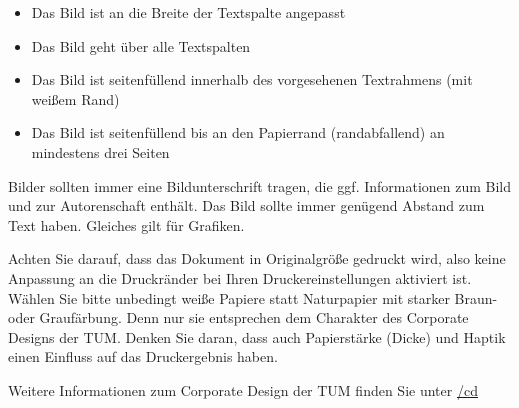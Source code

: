 \begin{itemize}
\item Das Bild ist an die Breite der Textspalte angepasst
\item Das Bild geht über alle Textspalten
\item Das Bild ist seitenfüllend innerhalb des vorgesehenen Textrahmens (mit weißem Rand)
\item Das Bild ist seitenfüllend bis an den Papierrand (randabfallend) an mindestens drei Seiten
\end{itemize}

Bilder sollten immer eine Bildunterschrift tragen, die ggf. Informationen zum Bild und zur Autorenschaft enthält. 
Das Bild sollte immer genügend Abstand zum Text haben. Gleiches gilt für Grafiken.

\ifx\PlakatBeschreibungBeispielbild\TRUE
{}
\fi

\ifx\PlakatBeschreibungDruck\TRUE
{}

Achten Sie darauf, dass das Dokument in Originalgröße gedruckt wird, also keine Anpassung an die Druckränder bei Ihren Druckereinstellungen aktiviert ist.
Wählen Sie bitte unbedingt weiße Papiere statt Naturpapier mit starker Braun- oder Graufärbung. Denn nur sie entsprechen dem Charakter des Corporate Designs der TUM. Denken Sie daran, dass auch Papierstärke (Dicke) und Haptik einen Einfluss auf das Druckergebnis haben.
\fi

\fi %

Weitere Informationen zum Corporate Design der TUM finden Sie unter
\href{http://\UniversitaetWebseite/cd}{\UniversitaetWebseite/cd}

